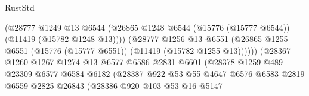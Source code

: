\begin{lexlean}{RustStd}
\begin{coremodule}
                                          (@28777
                                            @1249
                                            @13
                                            @6544
                                            (@26865
                                              @1248
                                              @6544
                                              (@15776 (@15777 @6544))
                                              (@11419 (@15782 @1248 @13))))
                                          (@28777
                                            @1256
                                            @13
                                            @6551
                                            (@26865
                                              @1255
                                              @6551
                                              (@15776 (@15777 @6551))
                                              (@11419 (@15782 @1255 @13))))))
                                      (@28367
                                        @1260
                                        @1267
                                        @1274
                                        @13
                                        @6577
                                        @6586
                                        @2831
                                        @6601
                                        (@28378
                                          @1259
                                          @489
                                          @23309
                                          @6577
                                          @6584
                                          @6182
                                          (@28387
                                            @922
                                            @53
                                            @55
                                            @4647
                                            @6576
                                            @6583
                                            @2819
                                            @6559
                                            @2825
                                            @26843
                                            (@28386
                                              @920
                                              @103
                                              @53
                                              @16
                                              @5147

\end{coremodule}
\end{lexlean}
